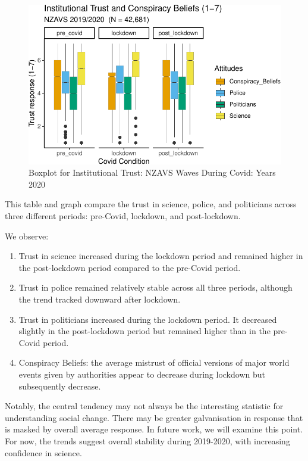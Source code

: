 \documentclass[
  singlecolumn]{report}
\providecommand{\tightlist}{%
  \setlength{\itemsep}{0pt}\setlength{\parskip}{0pt}}\usepackage{longtable,booktabs,array}
\begin{document}
\begin{figure}

{\centering \includegraphics{trust-science_files/figure-pdf/fig-trust-wave-11-1.pdf}

}

\caption{\label{fig-trust-wave-11}Boxplot for Institutional Trust: NZAVS
Waves During Covid: Years 2020}

\end{figure}

This table and graph compare the trust in science, police, and
politicians across three different periods: pre-Covid, lockdown, and
post-lockdown.

We observe:

\begin{enumerate}
\def\labelenumi{\arabic{enumi}.}
\tightlist
\item
  Trust in science increased during the lockdown period and remained
  higher in the post-lockdown period compared to the pre-Covid period.
\item
  Trust in police remained relatively stable across all three periods,
  although the trend tracked downward after lockdown.
\item
  Trust in politicians increased during the lockdown period. It
  decreased slightly in the post-lockdown period but remained higher
  than in the pre-Covid period.
\item
  Conspiracy Beliefs: the average mistrust of official versions of major
  world events given by authorities appear to decrease during lockdown
  but subsequently decrease.
\end{enumerate}

Notably, the central tendency may not always be the interesting
statistic for understanding social change. There may be greater
galvanisation in response that is masked by overall average response. In
future work, we will examine this point. For now, the trends suggest
overall stability during 2019-2020, with increasing confidence in
science.
\end{document}
